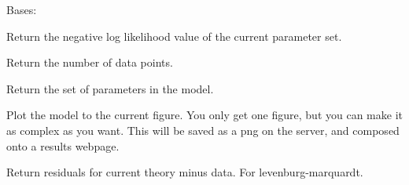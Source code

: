 \documentclass[letterpaper,10pt,english]{sphinxmanual}
\begin{document}
\begin{fulllineitems}
\label{api/fitproblem:refl1d.fitproblem.Fitness}
Bases: 

\begin{fulllineitems}
\label{api/fitproblem:refl1d.fitproblem.Fitness.nllf}
Return the negative log likelihood value of the current parameter set.

\end{fulllineitems}


\begin{fulllineitems}
\label{api/fitproblem:refl1d.fitproblem.Fitness.numpoints}
Return the number of data points.

\end{fulllineitems}


\begin{fulllineitems}
\label{api/fitproblem:refl1d.fitproblem.Fitness.parameters}
Return the set of parameters in the model.

\end{fulllineitems}


\begin{fulllineitems}
\label{api/fitproblem:refl1d.fitproblem.Fitness.plot}
Plot the model to the current figure.  You only get one figure, but you
can make it as complex as you want.  This will be saved as a png on
the server, and composed onto a results webpage.

\end{fulllineitems}


\begin{fulllineitems}
\label{api/fitproblem:refl1d.fitproblem.Fitness.residiuals}
Return residuals for current theory minus data.  For levenburg-marquardt.

\end{fulllineitems}


\end{fulllineitems}
\end{document}
